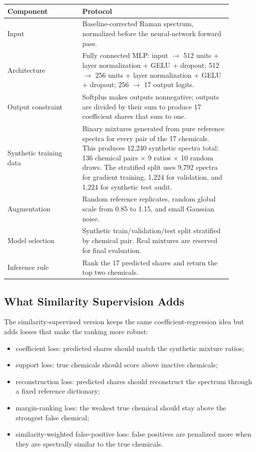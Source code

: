 \documentclass[11pt]{article}
\begin{document}
\begin{center}
\begin{tabular}{p{0.30\linewidth}p{0.60\linewidth}}
\toprule
\textbf{Component} & \textbf{Protocol} \\
\midrule
Input & Baseline-corrected Raman spectrum, normalized before the neural-network forward pass. \\
Architecture & Fully connected MLP: input $\rightarrow$ 512 units + layer normalization + GELU + dropout; 512 $\rightarrow$ 256 units + layer normalization + GELU + dropout; 256 $\rightarrow$ 17 output logits. \\
Output constraint & Softplus makes outputs nonnegative; outputs are divided by their sum to produce 17 coefficient shares that sum to one. \\
Synthetic training data & Binary mixtures generated from pure reference spectra for every pair of the 17 chemicals. This produces 12,240 synthetic spectra total: 136 chemical pairs $\times$ 9 ratios $\times$ 10 random draws. The stratified split uses 9,792 spectra for gradient training, 1,224 for validation, and 1,224 for synthetic test audit. \\
Augmentation & Random reference replicates, random global scale from 0.85 to 1.15, and small Gaussian noise. \\
Model selection & Synthetic train/validation/test split stratified by chemical pair. Real mixtures are reserved for final evaluation. \\
Inference rule & Rank the 17 predicted shares and return the top two chemicals. \\
\bottomrule
\end{tabular}
\end{center}

\subsection*{What Similarity Supervision Adds}

The similarity-supervised version keeps the same coefficient-regression idea but adds losses that make the ranking more robust:

\begin{itemize}[leftmargin=*]
\item coefficient loss: predicted shares should match the synthetic mixture ratios;
\item support loss: true chemicals should score above inactive chemicals;
\item reconstruction loss: predicted shares should reconstruct the spectrum through a fixed reference dictionary;
\item margin-ranking loss: the weakest true chemical should stay above the strongest false chemical;
\item similarity-weighted false-positive loss: false positives are penalized more when they are spectrally similar to the true chemicals.
\end{itemize}
\end{document}
